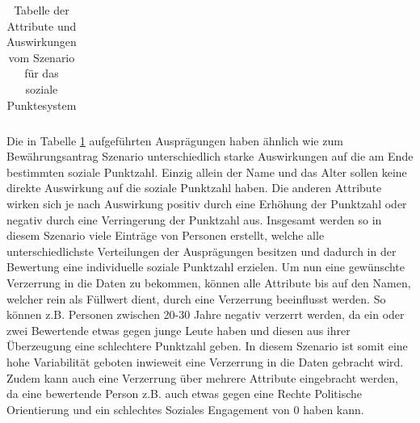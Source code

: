 \begin{onehalfspace}
\begin{table}[!h]
\begin{tabular}{|l|l|}
    \end{tabular}
\caption{Tabelle der Attribute und Auswirkungen vom Szenario für das soziale Punktesystem}
\label{table:2}
\end{table}
Die in Tabelle \ref*{table:2} aufgeführten Ausprägungen haben ähnlich wie zum Bewährungsantrag Szenario unterschiedlich starke Auswirkungen auf die am Ende bestimmten soziale Punktzahl. Einzig allein der Name und das Alter sollen keine direkte Auswirkung auf die soziale Punktzahl haben. Die anderen Attribute wirken sich je nach Auswirkung positiv durch eine Erhöhung der Punktzahl oder negativ durch eine Verringerung der Punktzahl aus.
Insgesamt werden so in diesem Szenario viele Einträge von Personen erstellt, welche alle unterschiedlichste Verteilungen der Ausprägungen besitzen und dadurch in der Bewertung eine individuelle soziale Punktzahl erzielen. Um nun eine gewünschte Verzerrung in die Daten zu bekommen, können alle Attribute bis auf den Namen, welcher rein als Füllwert dient, durch eine Verzerrung beeinflusst werden. So können z.B. Personen zwischen 20-30 Jahre negativ verzerrt werden, da ein oder zwei Bewertende etwas gegen junge Leute haben und diesen aus ihrer Überzeugung eine schlechtere Punktzahl geben. In diesem Szenario ist somit eine hohe Variabilität geboten inwieweit eine Verzerrung in die Daten gebracht wird. Zudem kann auch eine Verzerrung über mehrere Attribute eingebracht werden, da eine bewertende Person z.B. auch etwas gegen eine Rechte Politische Orientierung und ein schlechtes Soziales Engagement von 0 haben kann.

\end{onehalfspace}
